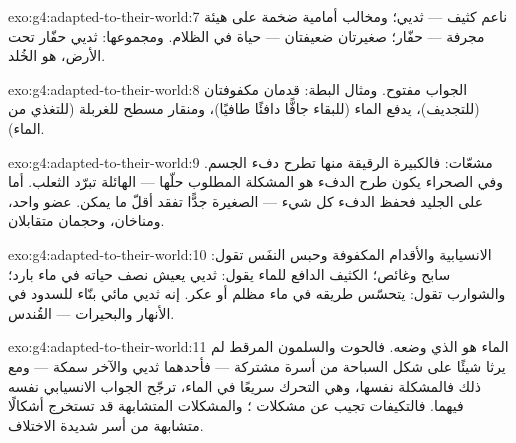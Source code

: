 \begin{solution}{exo:g4:adapted-to-their-world:7}
 ناعم كثيف --- ثديي؛ ومخالب أمامية ضخمة على هيئة مجرفة ---
حفّار؛  صغيرتان ضعيفتان --- حياة في الظلام. ومجموعها: ثديي
حفّار تحت الأرض، هو الخُلد.
\end{solution}

\begin{solution}{exo:g4:adapted-to-their-world:8}
الجواب مفتوح. ومثال البطة: قدمان مكفوفتان (للتجديف)،  يدفع
الماء (للبقاء جافًّا دافئًا طافيًا)، ومنقار مسطح للغربلة (للتغذي من
الماء).
\end{solution}

\begin{solution}{exo:g4:adapted-to-their-world:9}
 مشعّات: فالكبيرة الرقيقة منها تطرح دفء الجسم. وفي الصحراء
يكون طرح الدفء هو المشكلة المطلوب حلّها ---  الهائلة تبرّد
الثعلب. أما على الجليد فحفظ الدفء كل شيء ---  الصغيرة جدًّا
تفقد أقلّ ما يمكن. عضو واحد، ومناخان، وحجمان متقابلان.
\end{solution}

\begin{solution}{exo:g4:adapted-to-their-world:10}
الانسيابية والأقدام المكفوفة وحبس النفَس تقول: سابح وغائص؛ 
الكثيف الدافع للماء يقول: ثديي يعيش نصف حياته في ماء بارد؛
والشوارب تقول: يتحسّس طريقه في ماء مظلم أو عكر. إنه ثديي مائي
بنّاء للسدود في الأنهار والبحيرات --- القُندس.
\end{solution}

\begin{solution}{exo:g4:adapted-to-their-world:11}
الماء هو الذي وضعه. فالحوت والسلمون المرقط لم يرثا شيئًا على شكل
السباحة من أسرة مشتركة --- فأحدهما ثديي والآخر سمكة --- ومع ذلك
فالمشكلة نفسها، وهي التحرك سريعًا في الماء، ترجّح الجواب الانسيابي
نفسه فيهما. فالتكيفات تجيب عن مشكلات ؛ والمشكلات المتشابهة
قد تستخرج أشكالًا متشابهة من أسر شديدة الاختلاف.
\end{solution}

